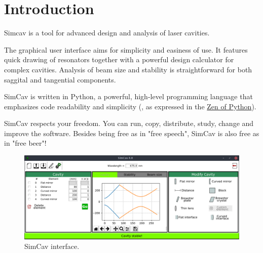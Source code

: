 \documentclass[11pt,a4paper,article,oneside]{memoir}
\title{}
\author{Julio M. Rodríguez-García}
\date{}
\begin{document}
	\graphicspath{{./Figures/}}
	
	\maketitle
	
	\mainmatter
	\section{Introduction}
	Simcav is a tool for advanced design and analysis of laser cavities. 
	
	The graphical user interface aims for simplicity and easiness of use. It features quick drawing of resonators together with a powerful design calculator for complex cavities. Analysis of beam size and stability is straightforward for both saggital and tangential components. 
	
	SimCav is written in Python, a powerful, high-level programming language that emphasizes code readability and simplicity (, as expressed in the \href{https://www.python.org/dev/peps/pep-0020/}{Zen of Python}).
	
	SimCav respects your freedom. You can run, copy, distribute, study, change and improve the software. Besides being free as in "free speech", SimCav is also free as in "free beer"! 

	\begin{figure}[h!]
		\centering
		\includegraphics[width=0.8\linewidth]{simcav.png}
		\caption[SimCav]{SimCav interface.}
		\label{fig:simcav}
	\end{figure}
\end{document}
